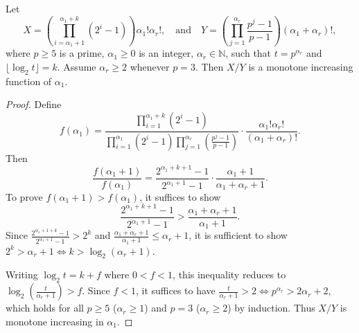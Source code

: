 \documentclass[10pt,a4paper]{amsart}
\begin{document}
\begin{lemma}\label{lem4.1}
Let
\[
X = \left( \prod_{i=\alpha_1+1}^{\alpha_1+k} (2^i - 1) \right) \alpha_1! \alpha_r!, \quad \text{and} \quad Y = \left( \prod_{j=1}^{\alpha_r} \frac{p^j - 1}{p - 1} \right) (\alpha_1 + \alpha_r)!,
\]
where $p \ge 5$ is a prime, $\alpha_1 \ge 0$ is an integer, $\alpha_r \in \mathbb{N}$, such that $t = p^{\alpha_r}$ and $\lfloor \log_2 t \rfloor = k$. Assume $\alpha_r \ge 2$ whenever $p = 3$. Then $X/Y$ is a monotone increasing function of $\alpha_1$.
\end{lemma}

\begin{proof}
Define
\[
f(\alpha_1) = \frac{\prod_{i=1}^{\alpha_1+k}(2^i - 1)}{\prod_{i=1}^{\alpha_1}(2^i - 1) \prod_{j=1}^{\alpha_r}\left(\frac{p^j-1}{p-1}\right)} \cdot \frac{\alpha_1! \alpha_r!}{(\alpha_1 + \alpha_r)!}.
\]
Then
\[
\frac{f(\alpha_1 + 1)}{f(\alpha_1)} = \frac{2^{\alpha_1+k+1} - 1}{2^{\alpha_1+1} - 1} \cdot \frac{\alpha_1 + 1}{\alpha_1 + \alpha_r + 1}.
\]
To prove $f(\alpha_1 + 1) > f(\alpha_1)$, it suffices to show
\[
\frac{2^{\alpha_1+k+1} - 1}{2^{\alpha_1+1} - 1} > \frac{\alpha_1 + \alpha_r + 1}{\alpha_1 + 1}.
\]
Since $\frac{2^{\alpha_1+1+k} - 1}{2^{\alpha_1+1} - 1} > 2^k$ and $\frac{\alpha_1+\alpha_r+1}{\alpha_1+1} \le \alpha_r + 1$, it is sufficient to show $2^k > \alpha_r + 1 \iff k > \log_2(\alpha_r + 1)$.

Writing $\log_2 t = k + f$ where $0 < f < 1$, this inequality reduces to $\log_2\left(\frac{t}{\alpha_r + 1}\right) > f$. Since $f < 1$, it suffices to have $\frac{t}{\alpha_r + 1} > 2 \iff p^{\alpha_r} > 2\alpha_r + 2$, which holds for all $p \ge 5$ ($\alpha_r \ge 1$) and $p = 3$ ($\alpha_r \ge 2$) by induction. Thus $X/Y$ is monotone increasing in $\alpha_1$.
\end{proof}
\end{document}
